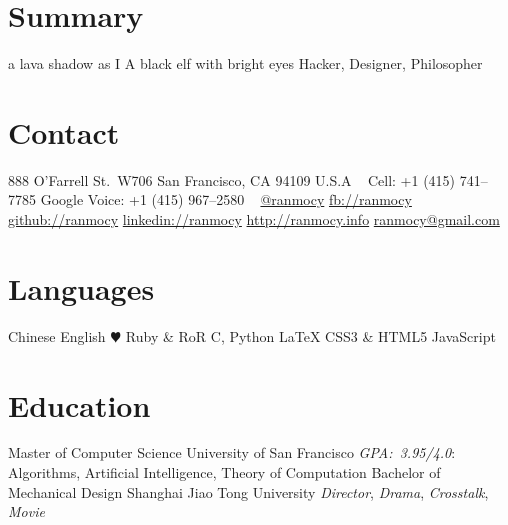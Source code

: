 \documentclass[]{friggeri-cv} %
\begin{document}


\begin{aside} %
  \section{Summary}
  a lava shadow as I
  A black elf
  with bright eyes
  Hacker,
  Designer,
  Philosopher
  \section{Contact}
  888 O'Farrell St.\ W706
  San Francisco, CA 94109
  U.S.A
  ~
  Cell:
  +1 (415) 741--7785
  Google Voice:
  +1 (415) 967--2580
  ~
  \href{https://twitter.com/ranmocy}{@ranmocy}
  \href{https://facebook.com/ranmocy}{fb://ranmocy}
  \href{https://github.com/ranmocy}{github://ranmocy}
  \href{http://www.linkedin.com/in/ranmocy}{linkedin://ranmocy}
  \href{http://ranmocy.info}{http://ranmocy.info}
  \href{mailto:ranmocy@gmail.com}{ranmocy@gmail.com}
  \section{Languages}
  Chinese
  English
  {\color{red} $\varheartsuit$} Ruby \& RoR
  C, Python
  LaTeX
  CSS3 \& HTML5
  JavaScript
\end{aside}


\section{Education}

\begin{entrylist}
  {Master \textnormal{of Computer Science}}
  {University of San Francisco}
  {
    \emph{GPA:~3.95/4.0}: Algorithms, Artificial Intelligence, Theory of Computation
  }
  {Bachelor \textnormal{of Mechanical Design}}
  {Shanghai Jiao Tong University}
  {
    \emph{Director}, \emph{Drama}, \emph{Crosstalk}, \emph{Movie}
  }
\end{entrylist}
\end{document}
